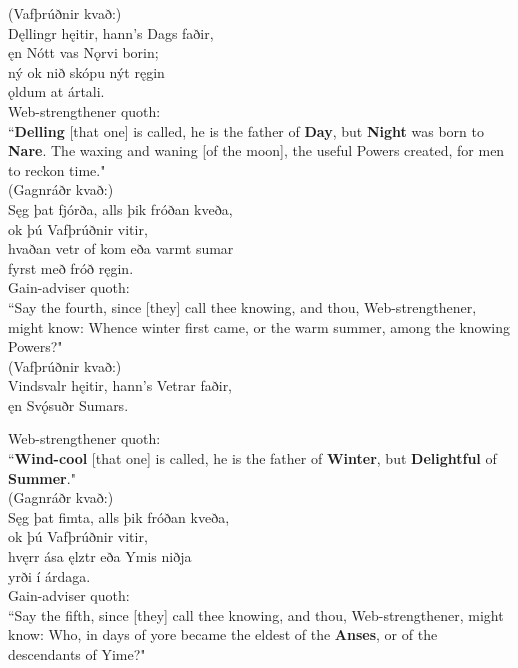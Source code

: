 (Vafþrúðnir kvað:) \\%
\bva Dęllingr hęitir, \hld hann's Dags faðir, \\%
ęn Nótt vas Nǫrvi borin; \\%
ný ok nið \hld skópu nýt ręgin \\%
ǫldum at ártali.\\%

\bvb Web-strengthener quoth: \\ “\textbf{Delling} [that one] is called, he is the father of \textbf{Day}, but \textbf{Night} was born to \textbf{Nare}. The waxing and waning [of the moon], the useful Powers created, for men to reckon time." \\

(Gagnráðr kvað:) \\%
\bva Sęg þat fjórða, \hld alls þik fróðan kveða, \\%
ok þú Vafþrúðnir vitir, \\%
hvaðan vetr of kom \hld eða varmt sumar \\%
fyrst með fróð ręgin.\\%

\bvb Gain-adviser quoth: \\ “Say the fourth, since [they] call thee knowing, and thou, Web-strengthener, might know: Whence winter first came, or the warm summer, among the knowing Powers?" \\

(Vafþrúðnir kvað:) \\%
\bva Vindsvalr hęitir, \hld hann's Vetrar faðir, \\%
ęn Svǫ́suðr Sumars.\footnotemark[15]\\%

\bvb Web-strengthener quoth: \\ “\textbf{Wind-cool} [that one] is called, he is the father of \textbf{Winter}, but \textbf{Delightful} of \textbf{Summer}." \\

(Gagnráðr kvað:) \\%
\bva Sęg þat fimta, \hld alls þik fróðan kveða, \\%
ok þú Vafþrúðnir vitir, \\%
hvęrr ása ęlztr \hld eða Ymis niðja \\%
yrði í árdaga.\\%

\bvb Gain-adviser quoth: \\ “Say the fifth, since [they] call thee knowing, and thou, Web-strengthener, might know: Who, in days of yore became the eldest of the \textbf{Anses}, or of the descendants of Yime?" \\

